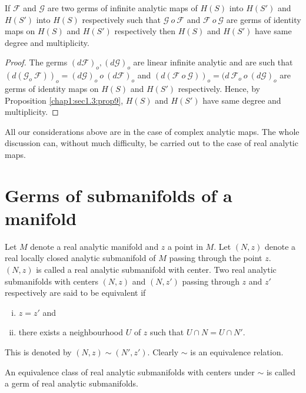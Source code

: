 \begin{proposition}\label{chap1:sec1.10:prop10}%
  If $\mathscr{F}$ and $\mathscr{G}$ are two germs of infinite
  analytic maps of $H(S)$ into $H(S')$ and $H(S')$ into $H(S)$
  respectively such that $\mathscr{G} ~ o ~ \mathscr{F}$ and
  $\mathscr{F} ~ o ~ \mathscr{G}$ are germs of identity maps on $H(S)$
  and $H(S')$ respectively then $H(S)$ and $H(S')$ have same degree
  and multiplicity. 
\end{proposition}

\begin{proof}%
  The germs $(d\mathscr{F})_o,  (d \mathscr{G})_o$ are linear infinite
  analytic and are such that $(d(\mathscr{G}_o ~ \mathscr{F}))_o =
  (d\mathscr{G})_o ~ o ~ (d \mathscr{F})_o$ and $(d(\mathscr{F} ~ o ~
  \mathscr{G}))_o = (d ~ \mathscr{F}_o ~ o ~ (d \mathscr{G})_o$ are
  germs of identity maps on $H(S)$ and $H(S')$ respectively. Hence,
  by Proposition \ref{chap1:sec1.3:prop9},  $H(S)$ and $H(S')$ have
  same degree and multiplicity. 
\end{proof}

All our considerations above are in the case of complex analytic
maps. The whole discussion can,  without much difficulty,  be carried
out to the case of real analytic maps. 

\section{Germs of submanifolds of a manifold}\label{chap1:sec1.11}%

Let  $M$ denote a real analytic manifold and $z$ a point in $M$. Let
$(N, z)$ denote a real locally closed analytic submanifold of $M$
passing through the point $z$. $(N, z)$ is called a real analytic
submanifold with center. Two real analytic submanifolds with centers
$(N, z)$ and $(N, z')$ passing through $z$ and $z'$ respectively are
said to be equivalent if 
\begin{enumerate}[(i)]
\item $z = z'$ and\pageoriginale 
\item there exists a neighbourhood $U$ of $z$ such that $U \cap N = U
  \cap N'$. 
\end{enumerate}

This is denoted by $(N, z) \sim (N',  z')$. Clearly $\sim$ is an
equivalence relation. 

\begin{defi*}%
  An equivalence class of real analytic submanifolds with centers
  under $\sim$ is called a germ of real analytic submanifolds. 
\end{defi*}

